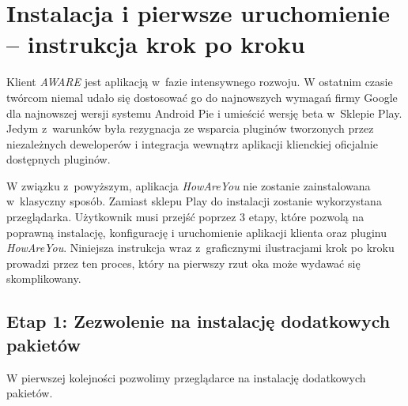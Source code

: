 \chapter{Instalacja i pierwsze uruchomienie -- instrukcja krok po kroku}
\label{cha:instalacjaIPierwszeUruchomienie}

Klient \textit{AWARE} jest aplikacją w~fazie intensywnego rozwoju. W ostatnim czasie twórcom niemal udało się dostosować go do najnowszych wymagań firmy Google dla najnowszej wersji systemu Android Pie i umieścić wersję beta w~Sklepie Play. Jedym z~warunków była rezygnacja ze wsparcia pluginów tworzonych przez niezależnych deweloperów i integracja wewnątrz aplikacji klienckiej oficjalnie dostępnych pluginów\cite{AwareFramework}.

W związku z~powyższym, aplikacja \textit{HowAreYou} nie zostanie zainstalowana w~klasyczny sposób. Zamiast sklepu Play do instalacji zostanie wykorzystana przeglądarka. Użytkownik musi przejść poprzez 3 etapy, które pozwolą na poprawną instalację, konfigurację i uruchomienie aplikacji klienta oraz pluginu \textit{HowAreYou}. Niniejsza instrukcja wraz z~graficznymi ilustracjami krok po kroku prowadzi przez ten proces, który na pierwszy rzut oka może wydawać się skomplikowany.


\section{Etap 1: Zezwolenie na instalację dodatkowych pakietów}
\label{sec:zezwolenieNaInstalacjeDodatkowychPakietow}

W pierwszej kolejności pozwolimy przeglądarce na instalację dodatkowych pakietów.

